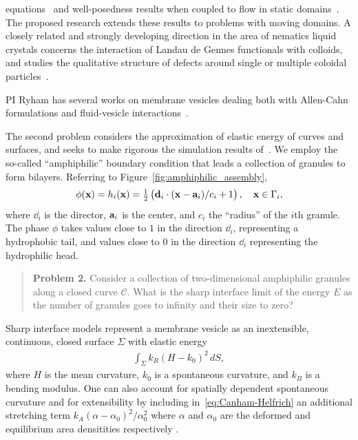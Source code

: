 equations~\cite{Christlieb2019CompetitionAC, Gavish2011CurvatureDF,
Dai2019WeakSF, Promislow2017ExistenceBA, Dai2015CompetitiveGE,
Promislow2012CriticalPO, Dai2022GeometricEO, Dai2020MinimizersFT,
Dai2013GeometricEO, Promislow2022UndulatedBI, Gera2017CahnHilliardOS}
and well-posedness
results when coupled to flow in static domains~\cite{Jiang2017TwophaseIF,
Liu2012StrongSF, Giorgini2019WellPosednessOA, Wu2022WellposednessOA,
Gal2010AsymptoticBO, Giorgini2020DiffuseIM, Giorgini2019UniquenessAR}.
The proposed research extends these results to problems with moving
domains. A closely related and strongly developing direction in the area
of nematics liquid crystals concerns the interaction of Landau de Gennes
functionals with colloids, and studies the qualitative structure of
defects around single or multiple coloidal
particles~\cite{doi:10.1098/rsta.2020.0432, Alama2015MinimizersOT,
  Alama2021SaturnRD, PhysRevE.96.042702}.

PI Ryham has several works on
membrane vesicles dealing both with Allen-Cahn formulations and
fluid-vesicle interactions~\cite{QiangDu09, RYHAM20112929, RyCoEi12,
Ryham2017OnTV}.

The second problem considers the approximation of elastic energy of
curves and surfaces, and seeks to make rigorous the simulation results
of~\cite{FuQuRyYo22, Fu2018_SIAM}. We employ the so-called
``amphiphilic'' boundary condition that leads a collection of
granules to form bilayers. Referring to
Figure~\ref{fig:amphiphilic_assembly}, 
\begin{align}
\label{eq:amphiphilic_BC}
  \phi(\xx) = h_i(\xx) = \tfrac{1}{2}\left(\dd_i \cdot 
    (\xx - \aa_i)/c_i + 1\right), \quad \xx \in \Gamma_i,
\end{align}
where $\dd_i$ is the director, $\aa_i$ is the center, and $c_i$ the
``radius'' of the $i$th granule. The phase $\phi$ takes values close to
$1$ in the direction $\dd_i$, representing a hydrophobic tail, and
values close to $0$ in the direction $\dd_i$ representing the
hydrophilic head.

\begin{quotation}
  \noindent
  \textbf{Problem 2.}
  Consider a collection of two-dimensional amphiphilic granules along a
  closed curve $\mathcal{C}$. What is the sharp interface limit of the
  energy $E$ as the number of granules goes to infinity and their size
  to zero?
\end{quotation}

Sharp interface models represent a membrane vesicle as an
inextensible, continuous, closed surface $\Sigma$ with elastic energy
\begin{align}
  \label{eq:Canham-Helfrich}
  \int_{\Sigma} k_B(H - k_0)^2\, dS,
\end{align}
where $H$ is the mean curvature, $k_0$ is a spontaneous curvature, and
$k_B$ is a bending modulus. One can also account
for spatially dependent spontaneous curvature
\cite{PhysRevE.79.031926,Lowengrub13,mahapatra_saintillan_rangamani_2020}
and for extensibility by
including in~\eqref{eq:Canham-Helfrich} an additional stretching term
$k_A(\alpha - \alpha_0)^2/\alpha_0^2$ where $\alpha$ and $\alpha_0$ are
the deformed and equilibrium area densitities respectively
\cite{chabanon2017}.

